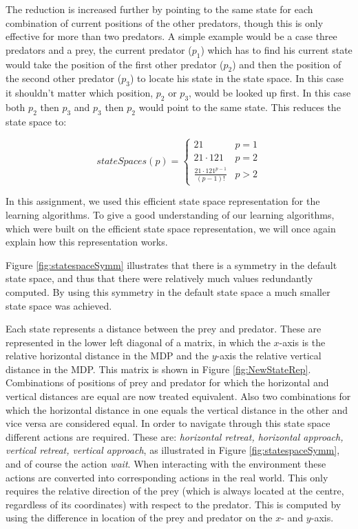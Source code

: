 The reduction is increased further by pointing to the same state for each combination of current positions of the other predators, though this is only effective for more than two predators. A simple example would be a case three predators and a prey, the current predator ($p_1$) which has to find his current state would take the position of the first other predator ($p_2$) and then the position of the second other predator ($p_3$) to locate his state in the state space. In this case it shouldn't matter which position, $p_2$ or $p_3$, would be looked up first. In this case both $p_2$ then $p_3$ and $p_3$ then $p_2$ would point to the same state. This reduces the state space to:

\[
stateSpaces(p) = 
\begin{cases}
	21 & p = 1\\
    21 \cdot 121 & p = 2 \\
    \frac{21\cdot 121^{p-1}}{(p-1)!}& p > 2
\end{cases}
\]

In this assignment, we used this efficient state space representation for the learning algorithms. To give a good understanding of our learning algorithms, which were built on the efficient state space representation, we will once again explain how this representation works.

Figure \ref{fig:statespaceSymm} illustrates that there is a symmetry in the default state space, and thus that there were relatively much values redundantly computed.
By using this symmetry in the default state space a much smaller state space was achieved. 

Each state represents a distance between the prey and predator. These are represented in the lower left diagonal of a matrix, in which the $x$-axis is the relative horizontal distance in the MDP and the $y$-axis the relative vertical distance in the MDP. This matrix is shown in Figure \ref{fig:NewStateRep}. Combinations of positions of prey and predator for which the horizontal and vertical distances are equal are now treated equivalent. 
Also two combinations for which the horizontal distance in one equals the vertical distance in the other and vice versa are considered equal. In order to navigate through this state space different actions are required. These are: \textit{horizontal retreat, horizontal approach, vertical retreat, vertical approach}, as illustrated in Figure \ref{fig:statespaceSymm}, and of course the action \textit{wait}. When interacting with the environment these actions are converted into corresponding actions in the real world. This only requires the relative direction of the prey (which is always located at the centre, regardless of its coordinates) with respect to the predator. This is computed by using the difference in location of the prey and predator on the $x$- and $y$-axis.

